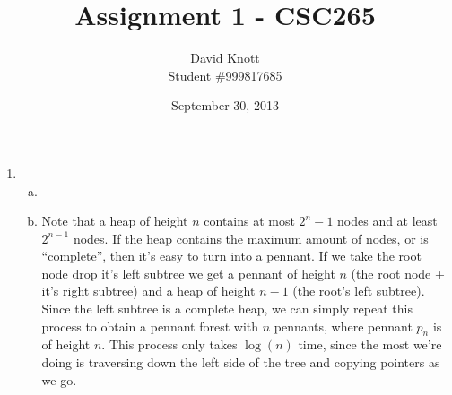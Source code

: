 \documentclass[letterpaper,10pt]{article}
\begin{document}
\title{Assignment 1 - CSC265}
\author{David Knott \\  Student \#999817685}
\date{September 30, 2013}
\maketitle
\begin{enumerate}
	\item 
	\begin{enumerate}[a)]
		\item
		\item Note that a heap of height $n$ contains at most $2^n - 1$ nodes and at least $2^{n-1}$ nodes. If the heap contains the maximum amount of nodes, or is ``complete'', then it's easy to turn into a pennant. If we take the root node drop it's left subtree we get a pennant of height $n$ (the root node + it's right subtree) and a heap of height $n-1$ (the root's left subtree). Since the left subtree is a complete heap, we can simply repeat this process to obtain a pennant forest with $n$ pennants, where pennant $p_n$ is of height $n$. This process only takes $\log(n)$ time, since the most we're doing is traversing down the left side of the tree and copying pointers as we go.


\end{enumerate}
\end{enumerate}
\end{document}

